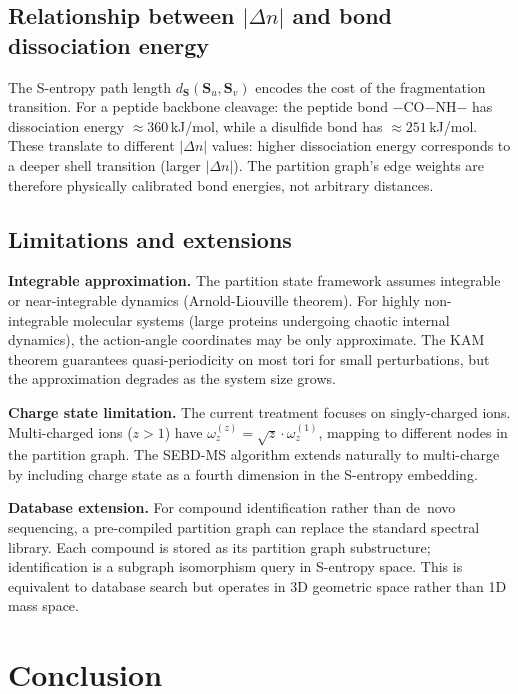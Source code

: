 \documentclass[twocolumn,10pt,a4paper]{article}
\theoremstyle{thmstyle}
\theoremstyle{definition}
\theoremstyle{remark}
\newcommand{\Sv}{\mathbf{S}}
\begin{document}
\subsection{Relationship between $|\Delta n|$ and bond dissociation energy}

The S-entropy path length $d_{\Sv}(\Sv_u, \Sv_v)$ encodes the cost
of the fragmentation transition. For a peptide backbone cleavage:
the peptide bond $-$CO$-$NH$-$ has dissociation energy
$\approx 360$\,kJ/mol, while a disulfide bond has
$\approx 251$\,kJ/mol. These translate to different $|\Delta n|$
values: higher dissociation energy corresponds to a deeper shell
transition (larger $|\Delta n|$). The partition graph's edge weights
are therefore physically calibrated bond energies, not arbitrary
distances.

\subsection{Limitations and extensions}

\textbf{Integrable approximation.} The partition state framework assumes
integrable or near-integrable dynamics (Arnold-Liouville theorem). For
highly non-integrable molecular systems (large proteins undergoing
chaotic internal dynamics), the action-angle coordinates may be only
approximate. The KAM theorem \citep{kolmogorov1954} guarantees
quasi-periodicity on most tori for small perturbations, but the
approximation degrades as the system size grows.

\textbf{Charge state limitation.} The current treatment focuses on
singly-charged ions. Multi-charged ions ($z > 1$) have
$\omega_z^{(z)} = \sqrt{z} \cdot \omega_z^{(1)}$, mapping to
different nodes in the partition graph. The SEBD-MS algorithm
extends naturally to multi-charge by including charge state as a
fourth dimension in the S-entropy embedding.

\textbf{Database extension.} For compound identification rather than
de~novo sequencing, a pre-compiled partition graph can replace the
standard spectral library. Each compound is stored as its partition
graph substructure; identification is a subgraph isomorphism query
in S-entropy space. This is equivalent to database search but operates
in 3D geometric space rather than 1D mass space.

\section{Conclusion}
\label{sec:conclusion}
\end{document}

